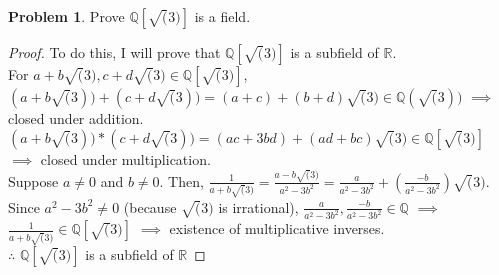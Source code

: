 \documentclass[11pt]{article}
\theoremstyle{definition}
\newtheorem{prob}[thm]{Problem}
\numberwithin{equation}{section}
\newcommand{\R}{\mathbb{R}}  %
\newcommand{\Q}{\mathbb{Q}}  %
\begin{document}
\begin{prob}
Prove $\Q[\sqrt(3)]$ is a field.
\end{prob}
\begin{proof}To do this, I will prove that $\Q[\sqrt(3)]$ is a subfield of $\R$.\\
For $a+b\sqrt(3), c+d\sqrt(3) \in \Q[\sqrt(3)]$, $(a+b\sqrt(3))+(c+d\sqrt(3)) = (a+c) + (b+d)\sqrt(3) \in \Q(\sqrt(3))$ $\implies$ closed under addition.\\
$(a+b\sqrt(3))*(c+d\sqrt(3)) = (ac+3bd) + (ad+bc)\sqrt(3) \in \Q[\sqrt(3)]$ $\implies$ closed under multiplication.\\
Suppose $a \neq 0$ and $b \neq 0$. Then, $\frac{1}{a+b\sqrt(3)} = \frac{a-b\sqrt(3)}{a^{2}-3b^{2}} = \frac{a}{a^{2}-3b^{2}} + (\frac{-b}{a^{2}-3b^{2}})\sqrt(3)$. Since $a^{2} - 3b^{2} \neq 0$ (because $\sqrt(3)$ is irrational), $\frac{a}{a^{2}-3b^{2}}, \frac{-b}{a^{2}-3b^{2}} \in \Q$ $\implies$ $\frac{1}{a+b\sqrt(3)} \in \Q[\sqrt(3)]$ $\implies$ existence of multiplicative inverses.\\
$\therefore$ $\Q[\sqrt(3)]$ is a subfield of $\R$
\end{proof}
\end{document}

